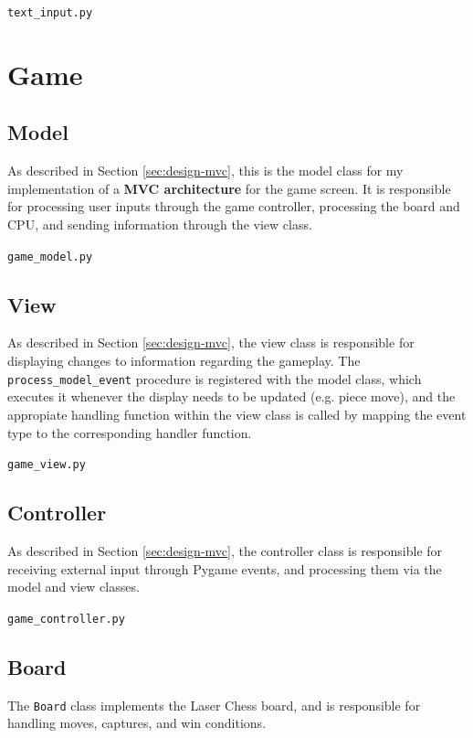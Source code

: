 \documentclass[../main/main.tex]{subfiles}
\begin{document}
\noindent\verb|text_input.py|


\section{Game}
\subsection{Model}
As described in Section \ref{sec:design-mvc}, this is the model class for my implementation of a \textbf{MVC architecture} for the game screen. It is responsible for processing user inputs through the game controller, processing the board and CPU, and sending information through the view class.

\noindent\verb|game_model.py|


\subsection{View}
As described in Section \ref{sec:design-mvc}, the view class is responsible for displaying changes to information regarding the gameplay. The \lstinline{process_model_event} procedure is registered with the model class, which executes it whenever the display needs to be updated (e.g. piece move), and the appropiate handling function within the view class is called by mapping the event type to the corresponding handler function.

\noindent\verb|game_view.py|


\subsection{Controller}
As described in Section \ref{sec:design-mvc}, the controller class is responsible for receiving external input through Pygame events, and processing them via the model and view classes.

\noindent\verb|game_controller.py|


\subsection{Board}
The \lstinline{Board} class implements the Laser Chess board, and is responsible for handling moves, captures, and win conditions.
\end{document}
